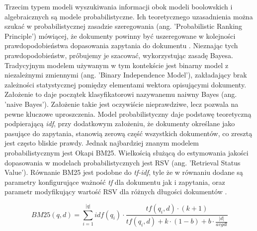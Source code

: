 Trzecim typem modeli wyszukiwania informacji obok modeli boolowskich i algebraicznych są
modele probabilistyczne. Ich teoretycznego uzasadnienia można szukać w probabilistycznej zasadzie
szeregowania (ang. 'Probabilistic Ranking Principle') mówiącej, że dokumenty powinny być
uszeregowane w kolejności prawdopodobieństwa dopasowania zapytania do dokumentu \autocite{robertson1977}. Nieznając tych prawdopodobieństw, próbujemy je szacować, wykorzystując zasadę Bayesa. Tradycyjnym modelem używanym w tym kontekście jest binarny model z niezależnymi zmiennymi (ang. 'Binary Independence Model'),
zakładający brak zależności statystycznej pomiędzy elementami wektora opisującymi dokumenty.
Założenie to daje początek klasyfikatorowi nazywanemu naiwny Bayes (ang. 'naive Bayes'). Założenie
takie jest oczywiście nieprawdziwe, lecz pozwala na pewne kluczowe uproszczenia. Model
probabilistyczny daje podstawę teoretyczną podpierającą {\it idf}, przy dodatkowym założeniu, że
dokumenty określane jako pasujące do zapytania, stanowią zerową część wszystkich dokumentów, co
zresztą jest często bliskie prawdy. Jednak najbardziej znanym modelem probabilistycznym jest Okapi
BM25. Wielkością służącą do estymowania jakości dopasowania w modelach probabilistycznych jest
RSV (ang. 'Retrieval Status Value'). Równanie BM25 jest podobne do {\it tf-idf}, tyle że w równaniu dodane
są parametry konfigurujące ważność {\it tf} dla dokumentu jak i zapytania, oraz parametr modyfikujący
wartość RSV dla różnych długości dokumentów \autocite{introtoinformationretrieval}.

\begin{equation}
	BM25(q, d) = \sum_{i=1}^{|q|} idf(q_i) \cdot \frac{tf(q_i, d) \cdot (k + 1)}{tf(q_i, d) + k \cdot (1 - b) + b \cdot \frac{|d|}{avgdl}}
\end{equation}\newline

